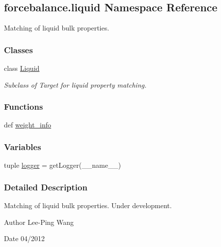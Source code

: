 \hypertarget{namespaceforcebalance_1_1liquid}{\subsection{forcebalance.\-liquid Namespace Reference}
\label{namespaceforcebalance_1_1liquid}
}


Matching of liquid bulk properties.  


\subsubsection*{Classes}
\begin{DoxyCompactItemize}
\item 
class \hyperlink{classforcebalance_1_1liquid_1_1Liquid}{Liquid}
\begin{DoxyCompactList}\small\item\em Subclass of Target for liquid property matching. \end{DoxyCompactList}\end{DoxyCompactItemize}
\subsubsection*{Functions}
\begin{DoxyCompactItemize}
\item 
def \hyperlink{namespaceforcebalance_1_1liquid_a6f7d54263236f8788c319aee86b460b6}{weight\-\_\-info}
\end{DoxyCompactItemize}
\subsubsection*{Variables}
\begin{DoxyCompactItemize}
\item 
tuple \hyperlink{namespaceforcebalance_1_1liquid_a8c47ecb4fda6a9bccb24ef292da2ec57}{logger} = get\-Logger(\-\_\-\-\_\-name\-\_\-\-\_\-)
\end{DoxyCompactItemize}


\subsubsection{Detailed Description}
Matching of liquid bulk properties. Under development.

\begin{DoxyAuthor}{Author}
Lee-\/\-Ping Wang 
\end{DoxyAuthor}
\begin{DoxyDate}{Date}
04/2012 
\end{DoxyDate}


